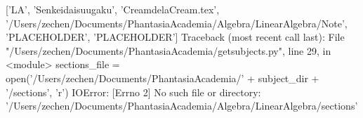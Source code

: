 ['LA', 'Senkeidaisuugaku', 'CreamdelaCream.tex', '/Users/zechen/Documents/PhantasiaAcademia/Algebra/LinearAlgebra/Note', 'PLACEHOLDER', 'PLACEHOLDER']
Traceback (most recent call last):
  File "/Users/zechen/Documents/PhantasiaAcademia/getsubjects.py", line 29, in <module>
    sections_file = open('/Users/zechen/Documents/PhantasiaAcademia/' + subject_dir + '/sections', 'r')
IOError: [Errno 2] No such file or directory: '/Users/zechen/Documents/PhantasiaAcademia/Algebra/LinearAlgebra/sections'
